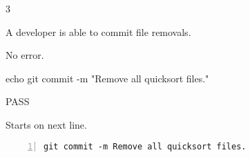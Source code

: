\begin{description}[align=right,leftmargin=3.2cm,labelindent=3.0cm]
\item[Step:] 3
\item[Confirm:] A developer is able to commit file removals.
\item[Expectation:] No error.
\item[Command:] echo git  commit -m "Remove all quicksort files."
\item[Test Result:] PASS
\item[Evidence:] Starts on next line.
\end{description}
\begin{lstlisting}[numbers=left]
git commit -m Remove all quicksort files.

\end{lstlisting}
